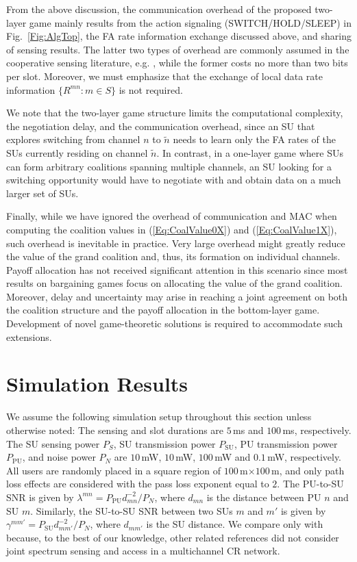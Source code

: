 \documentclass[journal,draftclsnofoot,onecolumn]{IEEEtran}
\theoremstyle{definition}
\begin{document}
From the above discussion, the communication overhead of the proposed two-layer game mainly results from the action signaling (SWITCH/HOLD/SLEEP) in Fig.~\ref{Fig:AlgTop}, the FA rate information exchange discussed above, and sharing of sensing results. The latter two types of overhead are commonly assumed in the cooperative sensing literature, e.g. \cite{HedonicSenseGame,AuctionBased,ZHanCoalSenseGame,FairPayoff,MultiChCoalSenseGame,Overlapp,RLiuEvoGame}, while the former costs no more than two bits per slot. Moreover, we must emphasize that the exchange of local data rate information $\{R^{mn}:m\in S\}$ is not required.

We note that the two-layer game structure limits the computational complexity, the negotiation delay, and the communication overhead, since an SU that explores switching from channel $n$ to $\tilde{n}$ needs to learn only the FA rates of the SUs currently residing on channel $\tilde{n}$. In contrast, in a one-layer game where SUs can form arbitrary coalitions spanning multiple channels, an SU looking for a switching opportunity would have to negotiate with and obtain data on a much larger set of SUs. 



Finally, while we have ignored the overhead of communication and MAC when computing the coalition values in (\ref{Eq:CoalValue0X}) and (\ref{Eq:CoalValue1X}), such overhead is inevitable in practice. Very large overhead might greatly reduce the value of the grand coalition and, thus, its formation on individual channels. Payoff allocation has not received significant attention in this scenario since most results on bargaining games focus on allocating the value of the grand coalition. Moreover, delay and uncertainty may arise in reaching a joint agreement on both the coalition structure and the payoff allocation in the bottom-layer game. Development of novel game-theoretic solutions is required to accommodate such extensions.

\section{Simulation Results}\label{Sec:Sim}
We assume the following simulation setup throughout this section unless otherwise noted: The sensing and slot durations are $5$\,ms and $100$\,ms, respectively. The SU sensing power $P_S$, SU transmission power $P_\mathrm{SU}$, PU transmission power $P_\mathrm{PU}$, and noise power $P_N$ are $10$\,mW, $10$\,mW, $100$\,mW and $0.1$\,mW, respectively. All users are randomly placed in a square region of $100$\,m${\times}100$\,m, and only path loss effects are considered with the pass loss exponent equal to $2$\cite{HedonicSenseGame}. The PU-to-SU SNR is given by $\lambda^{mn}=P_\mathrm{PU}d_{mn}^{-2}/P_N$, where $d_{mn}$ is the distance between PU $n$ and SU $m$. Similarly, the SU-to-SU SNR between two SUs $m$ and $m'$ is given by $\gamma^{mm'}=P_\mathrm{SU}d_{mm'}^{-2}/P_N$, where $d_{mm'}$ is the SU distance. We compare only with \cite{HedonicSenseGame} because, to the best of our knowledge, other related references did not consider joint spectrum sensing and access in a multichannel CR network.
\end{document}
